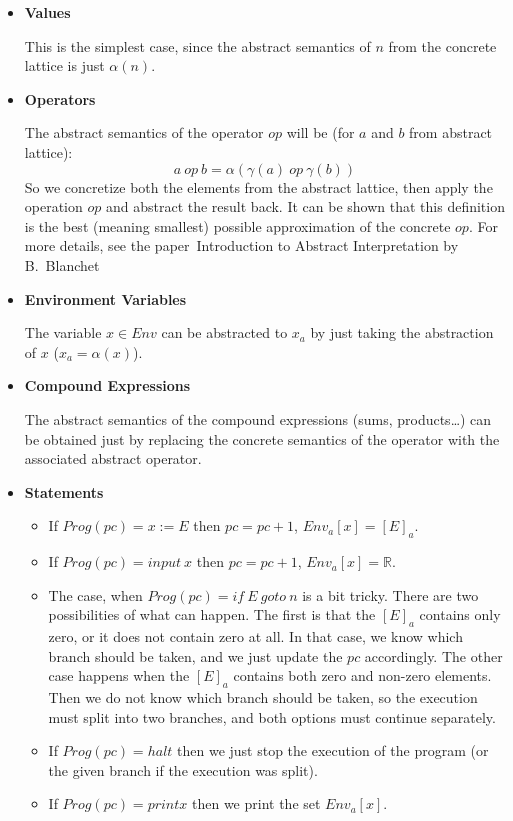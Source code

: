 \begin{itemize}
    \item \textbf{Values}

    This is the simplest case, since the abstract semantics of $n$ from the concrete lattice is just $\alpha(n)$.

    \item \textbf{Operators}

    The abstract semantics of the operator $op$ will be (for $a$ and $b$ from abstract lattice):
    \[a \: op \: b = \alpha(\gamma(a) \: op \: \gamma(b))\]
    So we concretize both the elements from the abstract lattice, then apply the operation $op$ and abstract the result
    back.
    It can be shown that this definition is the best (meaning smallest) possible approximation of the concrete $op$.
    For more details, see the paper~Introduction to Abstract Interpretation by B.~Blanchet\cite{Blanchet:2002:AI}


    \item \textbf{Environment Variables}

    The variable $x \in Env$ can be abstracted to $x_a$ by just taking the abstraction of $x$ ($x_a = \alpha(x)$).

    \item \textbf{Compound Expressions}

    The abstract semantics of the compound expressions (sums, products\ldots) can be obtained just by replacing the
    concrete semantics of the operator with the associated abstract operator.

    \item \textbf{Statements}

    \begin{itemize}
        \item
        If $Prog(pc) = x := E$ then
        $pc = pc + 1$, $Env_a[x] = [E]_a$.

        \item
        If $Prog(pc) = input \: x$ then
        $pc = pc + 1$, $Env_a[x] = \mathbb{R}$.

        \item
        The case, when $Prog(pc) = if \: E \: goto \: n$ is a bit tricky.
        There are two possibilities of what can happen.
        The first is that the $[E]_a$ contains only zero, or it does not contain zero at all.
        In that case, we know which branch should be taken, and we just update the $pc$ accordingly.
        The other case happens when the $[E]_a$ contains both zero and non-zero elements.
        Then we do not know which branch should be taken, so the execution must split into two branches, and both options
        must continue separately.

        \item
        If $Prog(pc) = halt$ then we just stop the execution of the program (or the given branch if the execution was
        split).

        \item
        If $Prog(pc) = print x$ then we print the set $Env_a[x].$
    \end{itemize}
\end{itemize}

